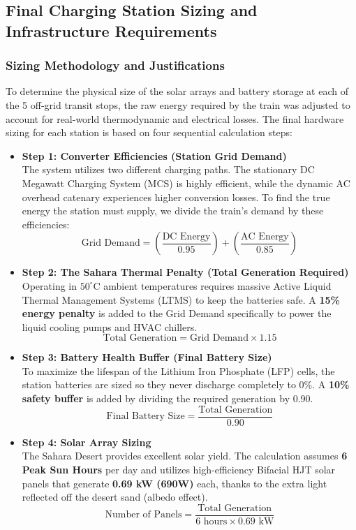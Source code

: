 \subsection{Final Charging Station Sizing and Infrastructure Requirements}

\subsubsection*{Sizing Methodology and Justifications}
To determine the physical size of the solar arrays and battery storage at each of the 5 off-grid transit stops, the raw energy required by the train was adjusted to account for real-world thermodynamic and electrical losses. The final hardware sizing for each station is based on four sequential calculation steps:

\begin{itemize}
    \item \textbf{Step 1: Converter Efficiencies (Station Grid Demand)} \\
    The system utilizes two different charging paths. The stationary DC Megawatt Charging System (MCS) is highly efficient, while the dynamic AC overhead catenary experiences higher conversion losses. To find the true energy the station must supply, we divide the train's demand by these efficiencies:
    \[
    \text{Grid Demand} = \left(\frac{\text{DC Energy}}{0.95}\right) + \left(\frac{\text{AC Energy}}{0.85}\right)
    \]
    
    \item \textbf{Step 2: The Sahara Thermal Penalty (Total Generation Required)} \\
    Operating in $50^\circ$C ambient temperatures requires massive Active Liquid Thermal Management Systems (LTMS) to keep the batteries safe. A \textbf{15\% energy penalty} is added to the Grid Demand specifically to power the liquid cooling pumps and HVAC chillers.
    \[
    \text{Total Generation} = \text{Grid Demand} \times 1.15
    \]

    \item \textbf{Step 3: Battery Health Buffer (Final Battery Size)} \\
    To maximize the lifespan of the Lithium Iron Phosphate (LFP) cells, the station batteries are sized so they never discharge completely to 0\%. A \textbf{10\% safety buffer} is added by dividing the required generation by 0.90.
    \[
    \text{Final Battery Size} = \frac{\text{Total Generation}}{0.90}
    \]

    \item \textbf{Step 4: Solar Array Sizing} \\
    The Sahara Desert provides excellent solar yield. The calculation assumes \textbf{6 Peak Sun Hours} per day and utilizes high-efficiency Bifacial HJT solar panels that generate \textbf{0.69 kW (690W)} each, thanks to the extra light reflected off the desert sand (albedo effect).
    \[
    \text{Number of Panels} = \frac{\text{Total Generation}}{6 \text{ hours} \times 0.69 \text{ kW}}
    \]
\end{itemize}

